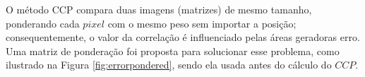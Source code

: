 O método CCP compara duas imagens (matrizes) de mesmo tamanho, 
ponderando cada $pixel$ com o mesmo peso sem importar a posição; 
consequentemente, o valor da correlação é influenciado pelas áreas 
geradoras erro.
Uma matriz de ponderação foi proposta para solucionar esse problema, como ilustrado na 
Figura \ref{fig:errorpondered}, sendo
ela usada antes do cálculo do $CCP$.

